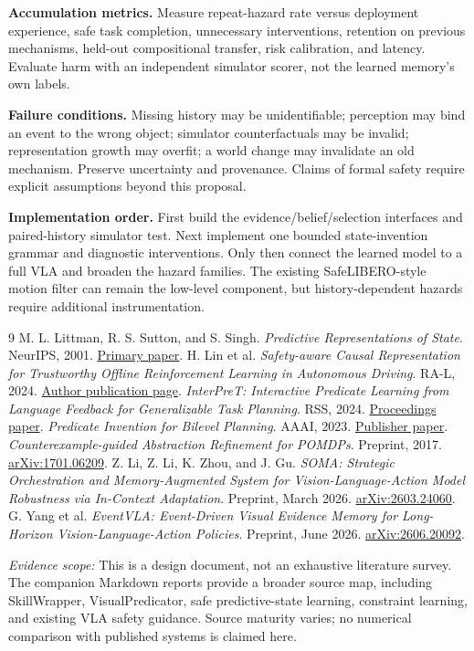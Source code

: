 \documentclass[10pt]{article}
\begin{document}
\textbf{Accumulation metrics.} Measure repeat-hazard rate versus deployment experience, safe task completion, unnecessary interventions, retention on previous mechanisms, held-out compositional transfer, risk calibration, and latency. Evaluate harm with an independent simulator scorer, not the learned memory's own labels.

\textbf{Failure conditions.} Missing history may be unidentifiable; perception may bind an event to the wrong object; simulator counterfactuals may be invalid; representation growth may overfit; a world change may invalidate an old mechanism. Preserve uncertainty and provenance. Claims of formal safety require explicit assumptions beyond this proposal.

\textbf{Implementation order.} First build the evidence/belief/selection interfaces and paired-history simulator test. Next implement one bounded state-invention grammar and diagnostic interventions. Only then connect the learned model to a full VLA and broaden the hazard families. The existing SafeLIBERO-style motion filter can remain the low-level component, but history-dependent hazards require additional instrumentation.

\begin{thebibliography}{9}
\small
{} M. L. Littman, R. S. Sutton, and S. Singh. \emph{Predictive Representations of State}. NeurIPS, 2001. \href{https://proceedings.neurips.cc/paper/2001/file/1e4d36177d71bbb3558e43af9577d70e-Paper.pdf}{Primary paper}.
 H. Lin et al. \emph{Safety-aware Causal Representation for Trustworthy Offline Reinforcement Learning in Autonomous Driving}. RA-L, 2024. \href{https://hhlin.info/publication/fusion/}{Author publication page}.
 \emph{InterPreT: Interactive Predicate Learning from Language Feedback for Generalizable Task Planning}. RSS, 2024. \href{https://www.roboticsproceedings.org/rss20/p034.pdf}{Proceedings paper}.
 \emph{Predicate Invention for Bilevel Planning}. AAAI, 2023. \href{https://ojs.aaai.org/index.php/AAAI/article/view/26429}{Publisher paper}.
 \emph{Counterexample-guided Abstraction Refinement for POMDPs}. Preprint, 2017. \href{https://arxiv.org/abs/1701.06209}{arXiv:1701.06209}.
 Z. Li, Z. Li, K. Zhou, and J. Gu. \emph{SOMA: Strategic Orchestration and Memory-Augmented System for Vision-Language-Action Model Robustness via In-Context Adaptation}. Preprint, March 2026. \href{https://arxiv.org/abs/2603.24060}{arXiv:2603.24060}.
 G. Yang et al. \emph{EventVLA: Event-Driven Visual Evidence Memory for Long-Horizon Vision-Language-Action Policies}. Preprint, June 2026. \href{https://arxiv.org/abs/2606.20092}{arXiv:2606.20092}.
\end{thebibliography}

\textit{Evidence scope:} This is a design document, not an exhaustive literature survey. The companion Markdown reports provide a broader source map, including SkillWrapper, VisualPredicator, safe predictive-state learning, constraint learning, and existing VLA safety guidance. Source maturity varies; no numerical comparison with published systems is claimed here.
\end{document}

